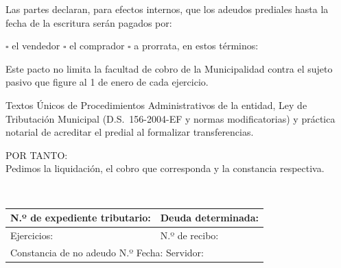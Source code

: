 \documentclass[12pt,a4paper]{article}
\begin{document}
Las partes declaran, para efectos internos, que los adeudos prediales hasta la fecha de la escritura serán pagados por:

\vspace{0.25em}
\noindent $\square$ el vendedor \quad $\square$ el comprador \quad $\square$ a prorrata, en estos términos: \linea[7.8cm]

\vspace{0.2em}
\noindent Este pacto no limita la facultad de cobro de la Municipalidad contra el sujeto pasivo que figure al 1 de enero de cada ejercicio.

Textos Únicos de Procedimientos Administrativos de la entidad, Ley de Tributación Municipal (D.S.\ 156-2004-EF y normas modificatorias) y práctica notarial de acreditar el predial al formalizar transferencias.

\vspace{0.3em}
\noindent POR TANTO:\\
Pedimos la liquidación, el cobro que corresponda y la constancia respectiva.

\LugarFecha

\noindent
{}
\hfill
{}

\vspace{0.9em}
\\
{\small\renewcommand{\arraystretch}{1.55}
\setlength{\tabcolsep}{5pt}
\noindent\begin{tabular}{|p{}|
p{}|}
\hline
N.º de expediente tributario:\newline\hrulefill & Deuda determinada:\newline\hrulefill \\
\hline
Ejercicios:\newline\hrulefill & N.º de recibo:\newline\hrulefill \\
\hline
\multicolumn{2}{|p{\dimexpr\linewidth-2\tabcolsep-2\arrayrulewidth}|}{%
Constancia de no adeudo N.º \hrulefill\quad Fecha: \hrulefill\newline
Servidor: \hrulefill}\\
\hline
\end{tabular}}
\end{document}
